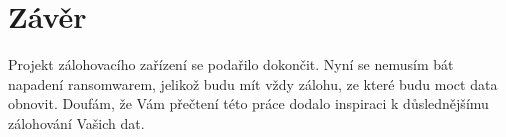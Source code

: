 \documentclass[a4paper,12pt, oneside]{book}
\begin{document}
\chapter{Závěr}


Projekt zálohovacího zařízení se podařilo dokončit. 
Nyní se nemusím bát napadení
ransomwarem, jelikož budu mít vždy zálohu, ze které budu moct data obnovit.
 Doufám, že Vám přečtení této práce dodalo inspiraci k
důslednějšímu zálohování Vašich dat.



\nocite{*}
\printbibliography[
	heading=bibintoc,
	title={Seznam zdrojů}
]

\cleardoublepage
\listoffigures
{}
\end{document}
